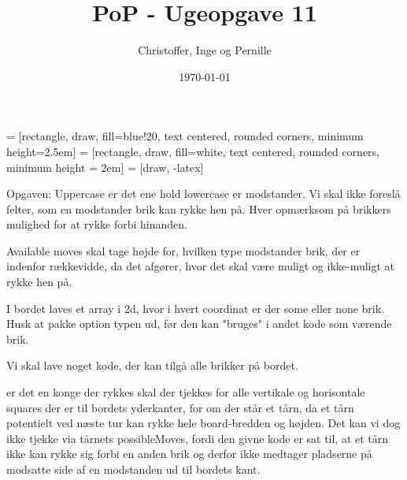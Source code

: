 \documentclass[a4paper]{report}
\title{PoP - Ugeopgave 11}
\author{Christoffer, Inge og Pernille}
\date{\today}
\begin{document}
\maketitle
{} = [rectangle, draw, fill=blue!20, text centered,
    rounded corners, minimum height=2.5em]
 = [rectangle, draw, fill=white, text centered,
    rounded corners, minimum height = 2em]
 = [draw, -latex]



Opgaven:
Uppercase er det ene hold lowercase er modstander.
Vi skal ikke foreslå felter, som en modstander brik kan rykke hen på. 
Hver opmærksom på brikkers mulighed for at rykke forbi hinanden.

Available moves skal tage højde for, hvilken type modstander brik, der er indenfor rækkevidde, da det afgører, hvor det skal være muligt og ikke-muligt at rykke hen på. 

I bordet laves et array i 2d, hvor i hvert coordinat er der some eller none brik.
Husk at pakke option typen ud, før den kan "bruges" i andet kode som værende brik.

Vi skal lave noget kode, der kan tilgå alle brikker på bordet.

er det en konge der rykkes skal der tjekkes for alle vertikale og horisontale squares der er til bordets yderkanter, for om der står et tårn, da et tårn potentielt ved næste tur kan rykke hele board-bredden og højden. Det kan vi dog ikke tjekke via tårnets possibleMoves, fordi den givne kode er sat til, at et tårn ikke kan rykke sig forbi en anden brik og derfor ikke medtager pladserne på modsatte side af en modstanden ud til bordets kant.
\end{document}
